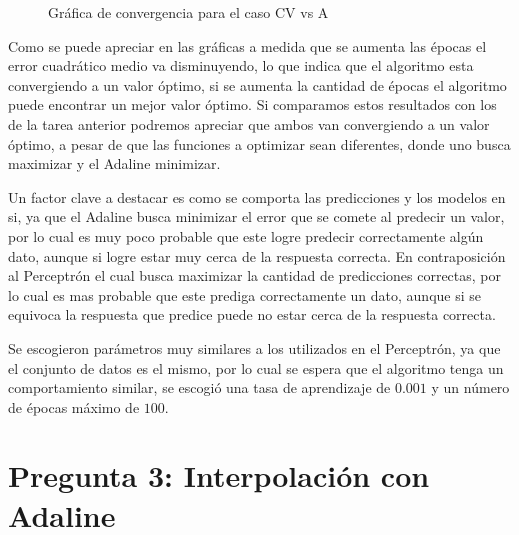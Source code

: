 \documentclass{article}
\theoremstyle{mytheoremstyle}
\theoremstyle{mytheoremstyle}
\theoremstyle{myproblemstyle}
\begin{document}
\vspace{0.6cm}

\begin{figure}[!ht]
  \centering
  \caption{Gráfica de convergencia para el caso CV vs A}
\end{figure}

Como se puede apreciar en las gráficas a medida que se aumenta las épocas el error cuadrático medio va disminuyendo, lo que indica que el algoritmo esta convergiendo a un valor óptimo, si se aumenta la cantidad de épocas el algoritmo puede encontrar un mejor valor óptimo. Si comparamos estos resultados con los de la tarea anterior podremos apreciar que ambos van convergiendo a un valor óptimo, a pesar de que las funciones a optimizar sean diferentes, donde uno busca maximizar y el Adaline minimizar.

Un factor clave a destacar es como se comporta las predicciones y los modelos en si, ya que el Adaline busca minimizar el error que se comete al predecir un valor, por lo cual es muy poco probable que este logre predecir correctamente algún dato, aunque si logre estar muy cerca de la respuesta correcta. En contraposición al Perceptrón el cual busca maximizar la cantidad de predicciones correctas, por lo cual es mas probable que este prediga correctamente un dato, aunque si se equivoca la respuesta que predice puede no estar cerca de la respuesta correcta.

Se escogieron parámetros muy similares a los utilizados en el Perceptrón, ya que el conjunto de datos es el mismo, por lo cual se espera que el algoritmo tenga un comportamiento similar, se escogió una tasa de aprendizaje de $0.001$ y un número de épocas máximo de $100$.

\section*{Pregunta 3: Interpolación con Adaline}
\end{document}
